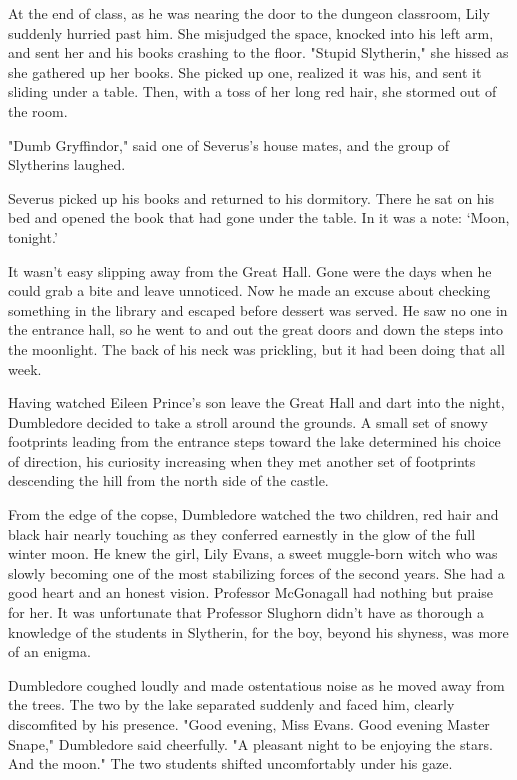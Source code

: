 At the end of class, as he was nearing the door to the dungeon classroom, Lily suddenly hurried past him. She misjudged the space, knocked into his left arm, and sent her and his books crashing to the floor. "Stupid Slytherin," she hissed as she gathered up her books. She picked up one, realized it was his, and sent it sliding under a table. Then, with a toss of her long red hair, she stormed out of the room.

"Dumb Gryffindor," said one of Severus's house mates, and the group of Slytherins laughed.

Severus picked up his books and returned to his dormitory. There he sat on his bed and opened the book that had gone under the table. In it was a note: `Moon, tonight.'

It wasn't easy slipping away from the Great Hall. Gone were the days when he could grab a bite and leave unnoticed. Now he made an excuse about checking something in the library and escaped before dessert was served. He saw no one in the entrance hall, so he went to and out the great doors and down the steps into the moonlight. The back of his neck was prickling, but it had been doing that all week.

Having watched Eileen Prince's son leave the Great Hall and dart into the night, Dumbledore decided to take a stroll around the grounds. A small set of snowy footprints leading from the entrance steps toward the lake determined his choice of direction, his curiosity increasing when they met another set of footprints descending the hill from the north side of the castle.

From the edge of the copse, Dumbledore watched the two children, red hair and black hair nearly touching as they conferred earnestly in the glow of the full winter moon. He knew the girl, Lily Evans, a sweet muggle-born witch who was slowly becoming one of the most stabilizing forces of the second years. She had a good heart and an honest vision. Professor McGonagall had nothing but praise for her. It was unfortunate that Professor Slughorn didn't have as thorough a knowledge of the students in Slytherin, for the boy, beyond his shyness, was more of an enigma.

Dumbledore coughed loudly and made ostentatious noise as he moved away from the trees. The two by the lake separated suddenly and faced him, clearly discomfited by his presence. "Good evening, Miss Evans. Good evening Master Snape," Dumbledore said cheerfully. "A pleasant night to be enjoying the stars. And the moon." The two students shifted uncomfortably under his gaze.

